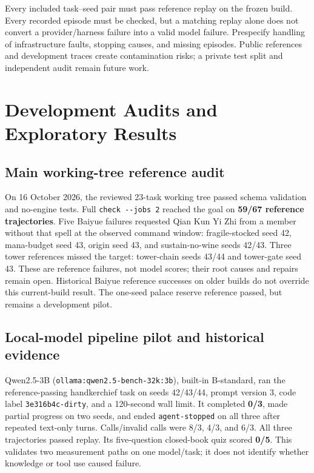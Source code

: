 \documentclass[11pt,a4paper]{article}
\begin{document}
Every included task--seed pair must pass reference replay on the frozen build. Every recorded episode must be checked, but a matching replay alone does not convert a provider/harness failure into a valid model failure. Prespecify handling of infrastructure faults, stopping causes, and missing episodes. Public references and development traces create contamination risks; a private test split and independent audit remain future work.

\section{\texorpdfstring{Development Audits and Exploratory Results}{Development Audits and Exploratory Results}}

\subsection{\texorpdfstring{Main working-tree reference audit}{Main working-tree reference audit}}

On 16 October 2026, the reviewed 23-task working tree passed schema validation and no-engine tests. Full \texttt{check\allowbreak{} \allowbreak{}-\allowbreak{}-\allowbreak{}jobs\allowbreak{} \allowbreak{}2} reached the goal on \textbf{59/67 reference trajectories}. Five Baiyue failures requested Qian Kun Yi Zhi from a member without that spell at the observed command window: fragile-stocked seed 42, mana-budget seed 43, origin seed 43, and sustain-no-wine seeds 42/43. Three tower references missed the target: tower-chain seeds 43/44 and tower-gate seed 43. These are reference failures, not model scores; their root causes and repairs remain open. Historical Baiyue reference successes on older builds do not override this current-build result. The one-seed palace reserve reference passed, but remains a development pilot.

\subsection{\texorpdfstring{Local-model pipeline pilot and historical evidence}{Local-model pipeline pilot and historical evidence}}

Qwen2.5-3B (\texttt{ollama\allowbreak{}:\allowbreak{}qwen2\allowbreak{}.\allowbreak{}5\allowbreak{}-\allowbreak{}bench\allowbreak{}-\allowbreak{}32k\allowbreak{}:\allowbreak{}3b}), built-in B-standard, ran the reference-passing handkerchief task on seeds 42/43/44, prompt version 3, code label \texttt{3e316b4c\allowbreak{}-\allowbreak{}dirty}, and a 120-second wall limit. It completed \textbf{0/3}, made partial progress on two seeds, and ended \texttt{agent\allowbreak{}-\allowbreak{}stopped} on all three after repeated text-only turns. Calls/invalid calls were 8/3, 4/3, and 6/3. All three trajectories passed replay. Its five-question closed-book quiz scored \textbf{0/5}. This validates two measurement paths on one model/task; it does not identify whether knowledge or tool use caused failure.
\end{document}

